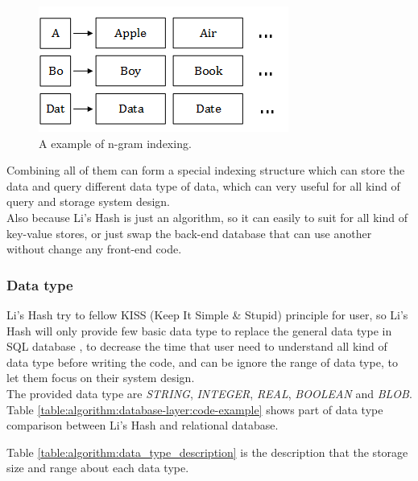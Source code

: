 \begin{figure}[h]
\centering
\includegraphics[scale=0.6]{./algorithm/pic/n-gram_v1.png}
\caption{A example of n-gram indexing.}
\label{fig:algorithm:n-gram}
\end{figure}

Combining all of them can form a special indexing structure which can store the data and query different data type of data, which can very useful for all kind of query and storage system design.\\

Also because Li's Hash is just an algorithm, so it can easily to suit for all kind of key-value stores, or just swap the back-end database that can use another without change any front-end code.\\


\subsubsection{Data type}

Li's Hash try to fellow KISS (Keep It Simple \& Stupid) principle for user, so Li's Hash will only provide few basic data type to replace the general data type in SQL database \cite{web:mysql:data-types,web:mysql:data-types-store-requirements,web:sqlite:data-types-3,web:transact-sql:data-types}, to decrease the time that user need to understand all kind of data type before writing the code, and can be ignore the range of data type, to let them focus on their system design.\\

The provided data type are \textit{STRING}, \textit{INTEGER}, \textit{REAL}, \textit{BOOLEAN} and \textit{BLOB}. Table \ref{table:algorithm:database-layer:code-example} shows part of data type comparison between Li's Hash and relational database.

Table \ref{table:algorithm:data_type_description} is the description that the storage size and range about each data type.\\


